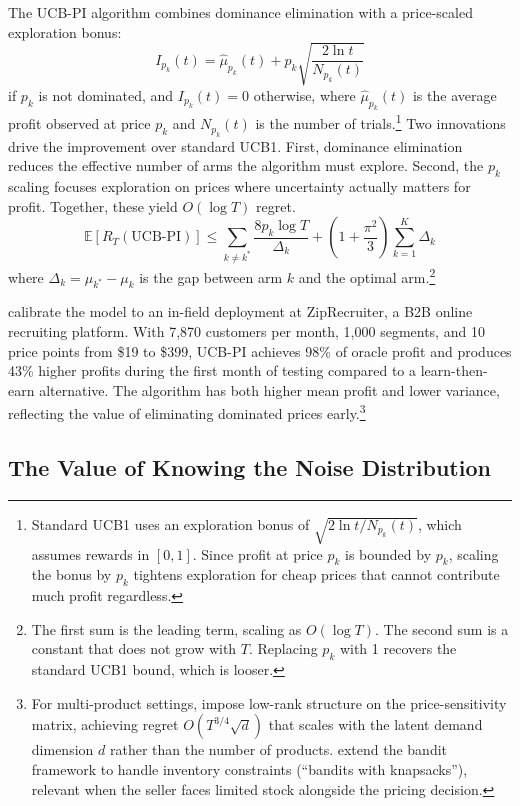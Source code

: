 The UCB-PI algorithm combines dominance elimination with a price-scaled exploration bonus:
\begin{equation}
\label{eq:ucbpi}
I_{p_k}(t) = \hat{\mu}_{p_k}(t) + p_k \sqrt{\frac{2 \ln t}{N_{p_k}(t)}}
\end{equation}
if $p_k$ is not dominated, and $I_{p_k}(t) = 0$ otherwise, where $\hat{\mu}_{p_k}(t)$ is the average profit observed at price $p_k$ and $N_{p_k}(t)$ is the number of trials.\footnote{Standard UCB1 uses an exploration bonus of $\sqrt{2\ln t / N_{p_k}(t)}$, which assumes rewards in $[0,1]$. Since profit at price $p_k$ is bounded by $p_k$, scaling the bonus by $p_k$ tightens exploration for cheap prices that cannot contribute much profit regardless.} Two innovations drive the improvement over standard UCB1. First, dominance elimination reduces the effective number of arms the algorithm must explore. Second, the $p_k$ scaling focuses exploration on prices where uncertainty actually matters for profit. Together, these yield $O(\log T)$ regret.
\begin{equation}
\mathbb{E}[R_T(\text{UCB-PI})] \leq \sum_{k \neq k^*} \frac{8 p_k \log T}{\Delta_k} + \left(1 + \frac{\pi^2}{3}\right) \sum_{k=1}^K \Delta_k
\end{equation}
where $\Delta_k = \mu_{k^*} - \mu_k$ is the gap between arm $k$ and the optimal arm.\footnote{The first sum is the leading term, scaling as $O(\log T)$. The second sum is a constant that does not grow with $T$. Replacing $p_k$ with 1 recovers the standard UCB1 bound, which is looser.}

\citet{Misra2019} calibrate the model to an in-field deployment at ZipRecruiter, a B2B online recruiting platform. With 7,870 customers per month, 1,000 segments, and 10 price points from \$19 to \$399, UCB-PI achieves 98\% of oracle profit and produces 43\% higher profits during the first month of testing compared to a learn-then-earn alternative. The algorithm has both higher mean profit and lower variance, reflecting the value of eliminating dominated prices early.\footnote{For multi-product settings, \citet{Mueller2019} impose low-rank structure on the price-sensitivity matrix, achieving regret $O(T^{3/4}\sqrt{d})$ that scales with the latent demand dimension $d$ rather than the number of products. \citet{Badanidiyuru2013} extend the bandit framework to handle inventory constraints (``bandits with knapsacks''), relevant when the seller faces limited stock alongside the pricing decision.}

\subsection{The Value of Knowing the Noise Distribution}
\label{sec:xu}

